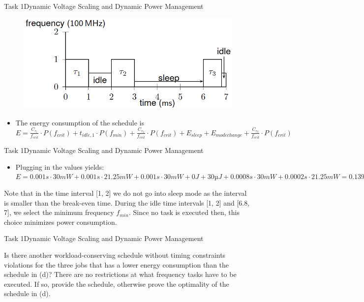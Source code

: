 \begin{frame}{Task 1}{Dynamic Voltage Scaling and Dynamic Power Management}
    \begin{solutionnoinc}
        \begin{figure}
            \centering
            \includegraphics[scale=0.5]{figures/scheduleD).PNG}
        \end{figure}
        \begin{itemize}
          \item The energy consumption of the schedule is $E = \frac{C_{\tau_1}}{f_{crit}} \cdot P(f_{crit})+ t_{idle,1} \cdot P(f_{min}) + \frac{C_{\tau_2}}{f_{crit}} \cdot P(f_{crit}) + E_{sleep} + E_{modechange} + \frac{C_{\tau_3}}{f_{crit}} \cdot P(f_{crit})$
        \end{itemize}
    \end{solutionnoinc}
\end{frame}
\begin{frame}{Task 1}{Dynamic Voltage Scaling and Dynamic Power Management}
    \begin{solution}
        \begin{itemize}
            \item Plugging in the values yields: $E = 0.001s \cdot 30mW + 0.001s \cdot 21.25mW + 0.001s \cdot 30mW + 0J + 30µJ + 0.0008s \cdot 30mW + 0.0002s \cdot 21.25mW = 0.1395 mJ$
        \end{itemize}
    \end{solution}
    \begin{Sidenote}
    Note that in the time interval [1, 2] we do not go into sleep mode as the interval is smaller than the break-even time. During the idle time intervals [1, 2] and [6.8, 7], we select the minimum frequency $f_{min}$. Since no task is executed then, this choice minimizes power consumption.
    \end{Sidenote}
\end{frame}
\begin{frame}{Task 1}{Dynamic Voltage Scaling and Dynamic Power Management}
    \begin{tasknoinc}
    Is there another workload-conserving schedule without timing constraints violations for the three jobs
that has a lower energy consumption than the schedule in (d)? There are no restrictions at what
frequency tasks have to be executed. If so, provide the schedule, otherwise prove the optimality of the
schedule in (d).
    \end{tasknoinc}
\end{frame}

